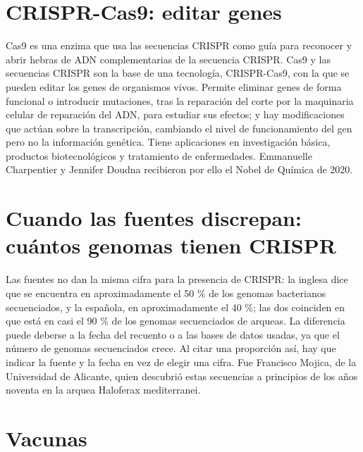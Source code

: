 \documentclass{book}
\begin{document}

\section{CRISPR-Cas9: editar genes}

Cas9 es una enzima que usa las secuencias CRISPR como guía para reconocer y abrir hebras de ADN complementarias de la secuencia CRISPR. Cas9 y las secuencias CRISPR son la base de una tecnología, CRISPR-Cas9, con la que se pueden editar los genes de organismos vivos. Permite eliminar genes de forma funcional o introducir mutaciones, tras la reparación del corte por la maquinaria celular de reparación del ADN, para estudiar sus efectos; y hay modificaciones que actúan sobre la transcripción, cambiando el nivel de funcionamiento del gen pero no la información genética. Tiene aplicaciones en investigación básica, productos biotecnológicos y tratamiento de enfermedades. Emmanuelle Charpentier y Jennifer Doudna recibieron por ello el Nobel de Química de 2020.


\section{Cuando las fuentes discrepan: cuántos genomas tienen CRISPR}

Las fuentes no dan la misma cifra para la presencia de CRISPR: la inglesa dice que se encuentra en aproximadamente el 50 \% de los genomas bacterianos secuenciados, y la española, en aproximadamente el 40 \%; las dos coinciden en que está en casi el 90 \% de los genomas secuenciados de arqueas. La diferencia puede deberse a la fecha del recuento o a las bases de datos usadas, ya que el número de genomas secuenciados crece. Al citar una proporción así, hay que indicar la fuente y la fecha en vez de elegir una cifra. Fue Francisco Mojica, de la Universidad de Alicante, quien descubrió estas secuencias a principios de los años noventa en la arquea Haloferax mediterranei.


\section{Vacunas}
\end{document}
